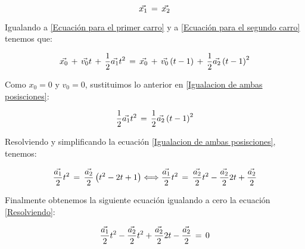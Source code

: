 \documentclass[letterpaper, 12pt]{article}
\begin{document}
\begin{enumerate}
\begin{enumerate}
            \begin{equation*}
                \vec{x_{1}} \thinspace = \thinspace \vec{x_{2}}
            \end{equation*}
            
            Igualando a \ref{Ecuación para el primer carro} y a \ref{Ecuación para el segundo carro} tenemos que:
            
            \begin{equation}
                \label{Igualacion de ambas posisciones}
                \vec{x_{0}} \thinspace + \thinspace \vec{v_{0}} t  \thinspace + \thinspace \frac{1}{2}\vec{a_{1}} t^2 \thinspace = \thinspace \vec{x_{0}} \thinspace + \thinspace \vec{v_{0}} \left(t-1 \right)  \thinspace + \thinspace \frac{1}{2}\vec{a_{2}} \left(t-1 \right)^2
            \end{equation}
            
            Como $x_{0} = 0$ y $v_{0} = 0$, sustituimos lo anterior en \ref{Igualacion de ambas posisciones}: 
            
            \begin{equation}
                \label{x_0 y v=0 sustitución en ec.20}
                \frac{1}{2}\vec{a_{1}} t^2 \thinspace = \thinspace  \frac{1}{2}\vec{a_{2}} \left(t-1 \right)^2
            \end{equation}
            
            Resolviendo y simplificando la ecuación \ref{Igualacion de ambas posisciones}, tenemos: 
            
            \begin{equation}
                \label{Resolviendo}
                \frac{\vec{a_{1}}}{2}t^{2} \thinspace = \thinspace \frac{\vec{a_{2}}}{2}\left( t^{2}-2t+1\right) \Longleftrightarrow  \frac{\vec{a_{1}}}{2}t^{2} \thinspace = \thinspace \frac{\vec{a_{2}}}{2}t^{2}-\frac{\vec{a_{2}}}{2}2t+\frac{\vec{a_{2}}}{2}
            \end{equation}
            
            Finalmente obtenemos la siguiente ecuación igualando a cero la ecuación \ref{Resolviendo}: 
            
            \begin{equation}
                \label{Ecuación 22 igualada a cero} \frac{\vec{a_{1}}}{2}t^{2}-\frac{\vec{a_{2}}}{2}t^{2}+\frac{\vec{a_{2}}}{2}2t-\frac{\vec{a_{2}}}{2} \thinspace = \thinspace 0
            \end{equation}
            

\end{enumerate}
\end{enumerate}
\end{document}
